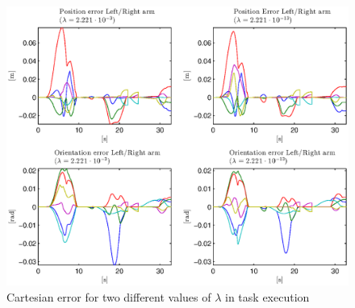 \begin{figure}
\vspace{2 mm}
\centering
\includegraphics[width=\textwidth]{gfx/Cartesian_error.eps}
\caption{Cartesian error for two different values of $\lambda$ in task execution}
\label{Cartesian_error}
\end{figure}

